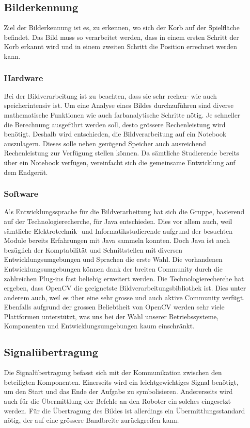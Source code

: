 \subsection{Bilderkennung}
Ziel der Bilderkennung ist es, zu erkennen, wo sich der Korb auf der 
Spielfläche befindet. Das Bild muss so verarbeitet werden, dass in einem 
ersten Schritt der Korb erkannt wird und in einem zweiten Schritt die Position 
errechnet werden kann.
\subsubsection{Hardware}
Bei der Bildverarbeitung ist zu beachten, dass sie sehr rechen- wie auch 
speicherintensiv ist. Um eine Analyse eines Bildes durchzuführen sind diverse 
mathematische Funktionen wie auch farbanalytische Schritte nötig. Je schneller 
die Berechnung ausgeführt werden soll, desto grössere Rechenleistung wird 
benötigt. Deshalb wird entschieden, die Bildverarbeitung auf ein Notebook 
auszulagern. Dieses solle neben genügend Speicher auch ausreichend 
Rechenleistung zur Verfügung stellen können. Da sämtliche Studierende bereits 
über ein Notebook verfügen, vereinfacht sich die gemeinsame Entwicklung auf 
dem Endgerät.

\subsubsection{Software}
Als Entwicklungssprache für die Bildverarbeitung hat sich die Gruppe, 
basierend auf der Technologierecherche, für Java entschieden. Dies vor allem 
auch, weil sämtliche Elektrotechnik- und Informatikstudierende aufgrund der 
besuchten Module bereits Erfahrungen mit Java sammeln konnten. Doch Java ist 
auch bezüglich der Komptabilität und Schnittstellen mit diversen 
Entwicklungsumgebungen und Sprachen die erste Wahl. Die vorhandenen 
Entwicklungsumgebungen können dank der breiten Community durch die zahlreichen 
Plug-ins fast beliebig erweitert werden.
Die Technologierecherche hat ergeben, dass OpenCV die geeignetste 
Bildverarbeitungsbibliothek ist. Dies unter anderem auch, weil es über eine 
sehr grosse und auch aktive Community verfügt. Ebenfalls aufgrund der grossen 
Beliebtheit von OpenCV werden sehr viele Plattformen unterstützt, was uns bei 
der Wahl unserer Betriebssysteme, Komponenten und Entwicklungsumgebungen kaum 
einschränkt.

\subsection{Signalübertragung}
Die Signalübertragung befasst sich mit der Kommunikation zwischen den 
beteiligten Komponenten. Einerseits wird ein leichtgewichtiges Signal 
benötigt, um den Start und das Ende der Aufgabe zu symbolisieren. Andererseits 
wird auch für die Übermittlung der Befehle an den Roboter ein solches 
eingesetzt werden. Für die Übertragung des Bildes ist allerdings ein 
Übermittlungsstandard nötig, der auf eine grössere Bandbreite zurückgreifen kann.

